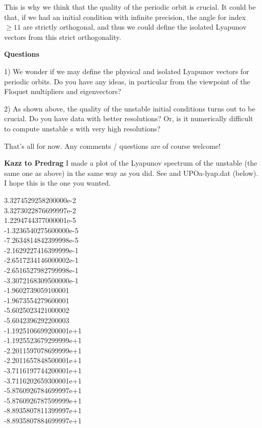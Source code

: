 \begin{description}
This is why we think that the quality of the periodic orbit is crucial.
It could be that, if we had an initial condition with infinite
precision, the angle for index $\geq 11$ are strictly orthogonal, and thus we
could define the isolated Lyapunov vectors from this strict orthogonality.


\textbf{Questions}

1) We wonder if we may define the physical and isolated Lyapunov vectors for
periodic orbits. Do you have any ideas, in particular from the viewpoint
of the Floquet multipliers and eigenvectors?

2) As shown above, the quality of the {unstable \po} initial conditions turns out
to be crucial. Do you have data with better resolutions? Or, is it
numerically difficult to compute {unstable \po}s with very high resolutions?

That's all for now. Any comments / questions are of course welcome!


\textbf{Kazz to Predrag} I made a plot of the Lyapunov spectrum of
the {unstable \po} (the same one as above) in the same way as you did. See 
and UPOa-lyap.dat (below). I hope this is the one you wanted.

                            \noindent
 3.3274529258200000e-2    \\
 3.3273022876699997e-2    \\
 1.2294744377000001e-5    \\
 -1.3236540275600000e-5    \\
 -7.2634814842399998e-5    \\
 -2.1629227416399999e-1    \\
 -2.6517234146000002e-1    \\
 -2.6516527982799998e-1    \\
 -3.3072168309500000e-1    \\
 -1.9602739059100001    \\
 -1.9673554279600001    \\
 -5.6025023421000002    \\
 -5.6042396292200003    \\
 -1.1925106699200001e+1    \\
 -1.1925523679299999e+1    \\
 -2.2011597078699999e+1    \\
 -2.2011657848500001e+1    \\
 -3.7116197744200001e+1    \\
 -3.7116202659300001e+1    \\
 -5.8760926784699997e+1    \\
 -5.8760926787599999e+1    \\
 -8.8935807811399997e+1    \\
 -8.8935807884699997e+1    \\


\end{description}
